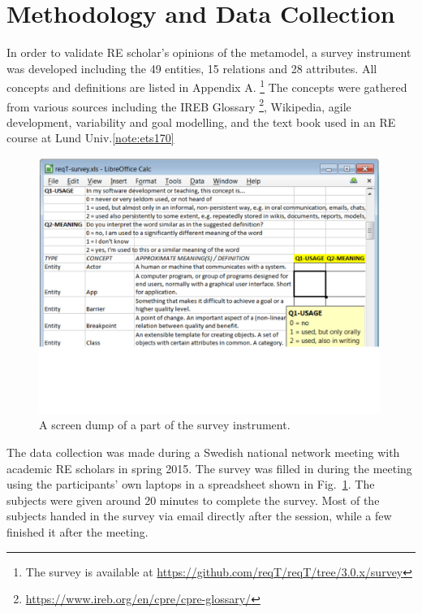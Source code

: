 \documentclass[a4paper]{llncs}
\begin{document}
\section{Methodology and Data Collection}
In order to validate RE scholar's opinions of the metamodel, a survey instrument was developed including the 49 entities, 15 relations and 28 attributes. All concepts and definitions are listed in Appendix A.  \footnote{The survey is available at \scriptsize\url{https://github.com/reqT/reqT/tree/3.0.x/survey}} 
The concepts were gathered from various sources including the IREB Glossary \footnote{\scriptsize\url{https://www.ireb.org/en/cpre/cpre-glossary/}}, Wikipedia,  agile development, variability \cite{metzger2007variability} and goal modelling, and the text book\cite{Lauesen2002} used in an RE course at Lund Univ.\cref{note:ets170} 
\vspace{-0.5cm}
\begin{figure}[h]
\centering
\includegraphics[width=0.99\textwidth]{img/survey-screen-dump}
\caption{A screen dump of a part of the survey instrument.}
\label{fig:survey}
\end{figure}
\vspace{-0.5cm}

\noindent The data collection was made during a Swedish national network meeting with academic RE scholars in spring 2015. The survey was filled in during the meeting using the participants' own laptops  in a spreadsheet shown in Fig.~\ref{fig:survey}. The subjects were given around 20 minutes to complete the survey. Most of the subjects handed in the survey via email directly after the session, while a few finished it after the meeting. 
\end{document}
